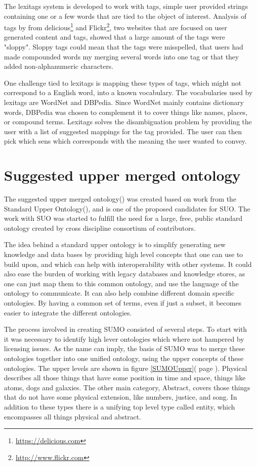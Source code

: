 The lexitags system is developed to work with tags,
simple user provided strings containing one or a few words that are tied to the object of interest.
Analysis of tags by \citet{Tonkin2006} from delicious\footnote{\url{https://delicious.com}} and Flickr\footnote{\url{http://www.flickr.com}},
two websites that are focused on user generated content and tags,
showed that a large amount of the tags were "sloppy".
Sloppy tags could mean that the tags were misspelled,
that users had made compounded words my merging several words into one tag
or that they added non-alphanumeric characters.

One challenge tied to lexitags is mapping these types of tags,
which might not correspond to a English word, into a known vocabulary.
The vocabularies used by lexitags are WordNet and DBPedia.
Since WordNet mainly contains dictionary words,
DBPedia was chosen to complement it to cover things like names, places, or compound terms.
Lexitags solves the disambiguation problem by providing the user with a list of suggested mappings for the tag provided.
The user can then pick which sens which corresponds with the meaning the user wanted to convey\citep{Veres2011}.

\section{Suggested upper merged ontology}
The suggested upper merged ontology() was created based on work from the Standard Upper Ontology(),
and is one of the proposed candidates for SUO.
The work with SUO was started to fulfill the need for a large, free, public standard ontology
created by cross discipline consortium of contributors.

The idea behind a standard upper ontology is to simplify generating new knowledge and data bases
by providing high level concepts that one can use to build upon,
and which can help with interoperability with other systems.
It could also ease the burden of working with legacy databases and knowledge stores,
as one can just map them to this common ontology, and use the language of the ontology to communicate.
It can also help combine different domain specific ontologies.
By having a common set of terms, even if just a subset,
it becomes easier to integrate the different ontologies\citep{Niles2001}.

The process involved in creating SUMO consisted of several steps.
To start with it was necessary to identify high lever ontologies which where not hampered by licensing issues.
As the name can imply, the basis of SUMO was to merge these ontologies together into one unified ontology,
using the upper concepts of these ontologies.
The upper levels are shown in figure \ref{SUMOUpper}( page \pageref{SUMOUpper}).
Physical describes all those things that have some position in time and space, things like atoms, dogs and galaxies.
The other main category, Abstract, covers those things that do not have some physical extension, like numbers,
justice, and song.
In addition to these types there is a unifying top level type called entity, which encompasses all things physical and abstract.

